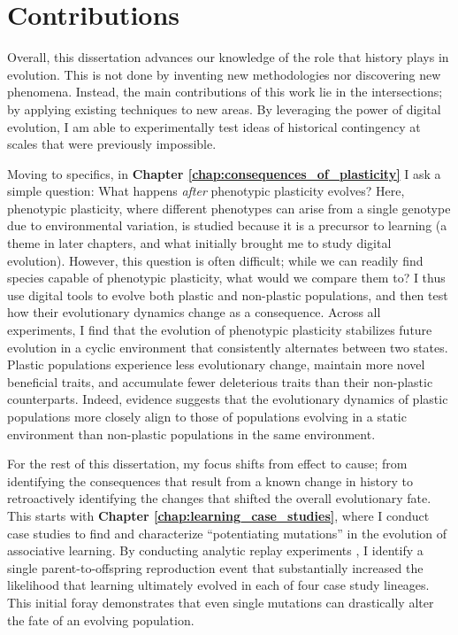 \section{Contributions}

Overall, this dissertation advances our knowledge of the role that history plays in evolution. 
This is not done by inventing new methodologies nor discovering new phenomena. 
Instead, the main contributions of this work lie in the intersections; by applying existing techniques to new areas. 
By leveraging the power of digital evolution, I am able to experimentally test ideas of historical contingency at scales that were previously impossible. 

Moving to specifics, in \textbf{Chapter \ref{chap:consequences_of_plasticity}} I ask a simple question: What happens \textit{after} phenotypic plasticity evolves? 
Here, phenotypic plasticity, where different phenotypes can arise from a single genotype due to environmental variation, is studied because it is a precursor to learning (a theme in later chapters, and what initially brought me to study digital evolution).
However, this question is often difficult; while we can readily find species capable of phenotypic plasticity, what would we compare them to? 
I thus use digital tools to evolve both plastic and non-plastic populations, and then test how their evolutionary dynamics change as a consequence. 
Across all experiments, I find that the evolution of phenotypic plasticity stabilizes future evolution in a cyclic environment that consistently alternates between two states. 
Plastic populations experience less evolutionary change, maintain more novel beneficial traits, and accumulate fewer deleterious traits than their non-plastic counterparts. 
Indeed, evidence suggests that the evolutionary dynamics of plastic populations more closely align to those of populations evolving in a static environment than non-plastic populations in the same environment.  


For the rest of this dissertation, my focus shifts from effect to cause; from identifying the consequences that result from a known change in history to retroactively identifying the changes that shifted the overall evolutionary fate. 
This starts with \textbf{Chapter \ref{chap:learning_case_studies}}, where I conduct case studies to find and characterize ``potentiating mutations'' in the evolution of associative learning. 
By conducting analytic replay experiments \citep{blountContingencyDeterminismEvolution2018}, I identify a single parent-to-offspring reproduction event that substantially increased the likelihood that learning ultimately evolved in each of four case study lineages.
This initial foray demonstrates that even single mutations can drastically alter the fate of an evolving population.

